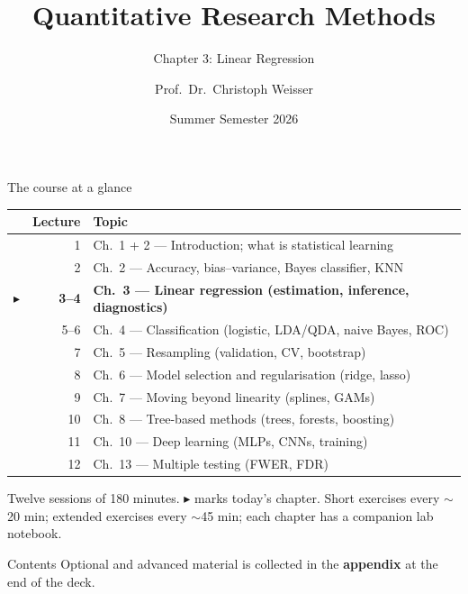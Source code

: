 \documentclass[aspectratio=169,11pt]{beamer}
\title{Quantitative Research Methods}
\subtitle{Chapter 3: Linear Regression}
\author{Prof.\ Dr.\ Christoph Weisser}
\institute{HSBI}
\date{Summer Semester 2026}
\begin{document}
\begin{frame}[plain]
  \titlepage
\end{frame}

\begin{frame}{The course at a glance}
  \footnotesize
  \begin{center}
  \begin{tabular}{@{}c r l@{}}
    & \textbf{Lecture} & \textbf{Topic}\\
    \midrule
     & 1 & Ch.\ 1 + 2 --- Introduction; what is statistical learning \\
     & 2 & Ch.\ 2 --- Accuracy, bias--variance, Bayes classifier, KNN \\
    $\blacktriangleright$ & \textbf{3--4} & \textbf{Ch.\ 3 --- Linear regression (estimation, inference, diagnostics)} \\
     & 5--6 & Ch.\ 4 --- Classification (logistic, LDA/QDA, naive Bayes, ROC) \\
     & 7 & Ch.\ 5 --- Resampling (validation, CV, bootstrap) \\
     & 8 & Ch.\ 6 --- Model selection and regularisation (ridge, lasso) \\
     & 9 & Ch.\ 7 --- Moving beyond linearity (splines, GAMs) \\
     & 10 & Ch.\ 8 --- Tree-based methods (trees, forests, boosting) \\
     & 11 & Ch.\ 10 --- Deep learning (MLPs, CNNs, training) \\
     & 12 & Ch.\ 13 --- Multiple testing (FWER, FDR) \\
  \end{tabular}
  \end{center}
  \vspace{2pt}
  {\scriptsize Twelve sessions of 180 minutes. $\blacktriangleright$ marks today's chapter. Short exercises every $\sim$20 min; extended exercises every $\sim$45 min; each chapter has a companion lab notebook.}
\end{frame}



\begin{frame}{Contents}\footnotesize
  \tableofcontents[hideallsubsections]
  \vfill
  {\tiny Optional and advanced material is collected in the \textbf{appendix} at the end of the deck.}
\end{frame}
\end{document}

